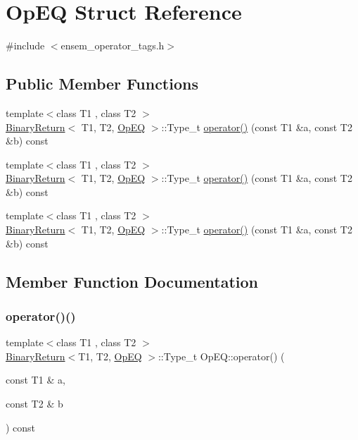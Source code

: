 \hypertarget{structOpEQ}{}\section{Op\+EQ Struct Reference}
\label{structOpEQ}


{\ttfamily \#include $<$ensem\+\_\+operator\+\_\+tags.\+h$>$}

\subsection*{Public Member Functions}
\begin{DoxyCompactItemize}
\item 
{\footnotesize template$<$class T1 , class T2 $>$ }\\\mbox{\hyperlink{structBinaryReturn}{Binary\+Return}}$<$ T1, T2, \mbox{\hyperlink{structOpEQ}{Op\+EQ}} $>$\+::Type\+\_\+t \mbox{\hyperlink{structOpEQ_aadd4c1f0508ded0e1ad084d0a724f912}{operator()}} (const T1 \&a, const T2 \&b) const
\item 
{\footnotesize template$<$class T1 , class T2 $>$ }\\\mbox{\hyperlink{structBinaryReturn}{Binary\+Return}}$<$ T1, T2, \mbox{\hyperlink{structOpEQ}{Op\+EQ}} $>$\+::Type\+\_\+t \mbox{\hyperlink{structOpEQ_aadd4c1f0508ded0e1ad084d0a724f912}{operator()}} (const T1 \&a, const T2 \&b) const
\item 
{\footnotesize template$<$class T1 , class T2 $>$ }\\\mbox{\hyperlink{structBinaryReturn}{Binary\+Return}}$<$ T1, T2, \mbox{\hyperlink{structOpEQ}{Op\+EQ}} $>$\+::Type\+\_\+t \mbox{\hyperlink{structOpEQ_aadd4c1f0508ded0e1ad084d0a724f912}{operator()}} (const T1 \&a, const T2 \&b) const
\end{DoxyCompactItemize}


\subsection{Member Function Documentation}
\mbox{\label{structOpEQ_aadd4c1f0508ded0e1ad084d0a724f912}} 
\subsubsection{\texorpdfstring{operator()()}{operator()()}\hspace{0.1cm}{\footnotesize\ttfamily [1/3]}}
{\footnotesize\ttfamily template$<$class T1 , class T2 $>$ \\
\mbox{\hyperlink{structBinaryReturn}{Binary\+Return}}$<$T1, T2, \mbox{\hyperlink{structOpEQ}{Op\+EQ}} $>$\+::Type\+\_\+t Op\+E\+Q\+::operator() (\begin{DoxyParamCaption}\item[{const T1 \&}]{a,  }\item[{const T2 \&}]{b }\end{DoxyParamCaption}) const\hspace{0.3cm}{\ttfamily [inline]}}

